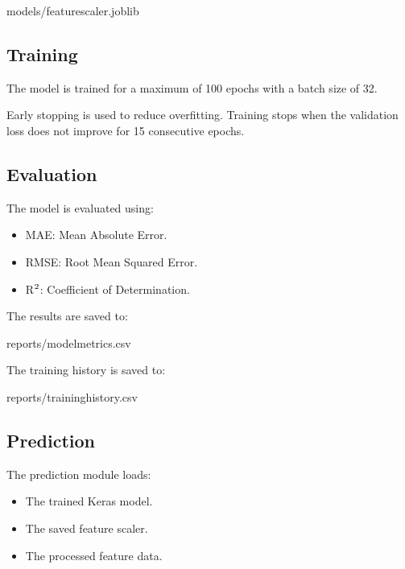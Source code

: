 \documentclass[letterpaper,10pt,english]{sphinxmanual}
\begin{document}
\begin{sphinxVerbatim}[commandchars=\\\{\}]
models/feature\PYGZus{}scaler.joblib
\end{sphinxVerbatim}


\subsection{Training}
\label{\detokenize{workflow:training}}
\sphinxAtStartPar
The model is trained for a maximum of 100 epochs with a batch size of 32.

\sphinxAtStartPar
Early stopping is used to reduce overfitting. Training stops when the
validation loss does not improve for 15 consecutive epochs.


\subsection{Evaluation}
\label{\detokenize{workflow:evaluation}}
\sphinxAtStartPar
The model is evaluated using:
\begin{itemize}
\item {} 
\sphinxAtStartPar
MAE: Mean Absolute Error.

\item {} 
\sphinxAtStartPar
RMSE: Root Mean Squared Error.

\item {} 
\sphinxAtStartPar
R\(\sp{\text{2}}\): Coefficient of Determination.

\end{itemize}

\sphinxAtStartPar
The results are saved to:

\begin{sphinxVerbatim}[commandchars=\\\{\}]
reports/model\PYGZus{}metrics.csv
\end{sphinxVerbatim}

\sphinxAtStartPar
The training history is saved to:

\begin{sphinxVerbatim}[commandchars=\\\{\}]
reports/training\PYGZus{}history.csv
\end{sphinxVerbatim}


\subsection{Prediction}
\label{\detokenize{workflow:prediction}}
\sphinxAtStartPar
The prediction module loads:
\begin{itemize}
\item {} 
\sphinxAtStartPar
The trained Keras model.

\item {} 
\sphinxAtStartPar
The saved feature scaler.

\item {} 
\sphinxAtStartPar
The processed feature data.

\end{itemize}
\end{document}

